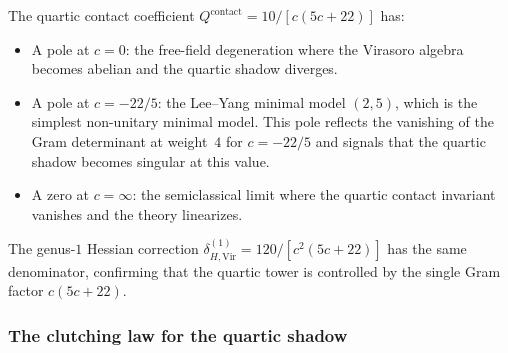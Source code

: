 \begin{remark}
\label{rem:thqg-VI-virasoro-poles}
The quartic contact coefficient
$Q^{\mathrm{contact}} = 10/[c(5c+22)]$ has:
\begin{itemize}
\item A pole at $c = 0$: the free-field degeneration where
 the Virasoro algebra becomes abelian and the quartic shadow
 diverges.
\item A pole at $c = -22/5$: the Lee--Yang minimal model
 $(2,5)$, which is the simplest non-unitary minimal model.
 This pole reflects the vanishing of the Gram determinant at
 weight~$4$ for $c = -22/5$ and signals that the quartic
 shadow becomes singular at this value.
\item A zero at $c = \infty$: the semiclassical limit where the
 quartic contact invariant vanishes and the theory linearizes.
\end{itemize}
The genus-$1$ Hessian correction
$\delta_{H,\mathrm{Vir}}^{(1)} = 120/[c^2(5c+22)]$ has the same
denominator, confirming that the quartic tower is controlled
by the single Gram factor $c(5c+22)$.
\end{remark}

\subsubsection{The clutching law for the quartic shadow}

